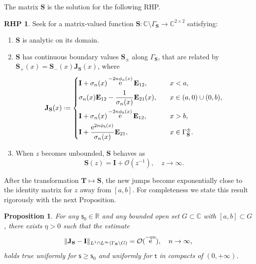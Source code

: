 \documentclass[reqno,a4paper,11pt]{amsart}
\DeclareMathOperator{\ee}{\rm e}
\newcommand{\C}{\mathbb{C}}
\newcommand{\R}{\mathbb{R}}
\newcommand{\Boh}{\mathcal{O}}
\renewcommand{\bm}{\mathbf}
\newcommand{\msf}{\mathsf}
\newcommand{\sad}{\msf s}
\newtheorem{prop}[theorem]{Proposition}
\theoremstyle{definition}
\newtheorem{rhp}[theorem]{RHP}
\theoremstyle{remark}
\numberwithin{equation}{section}
\newcommand*{\defeq}{\mathrel{\vcenter{\baselineskip0.5ex \lineskiplimit0pt
                     \hbox{\scriptsize.}\hbox{\scriptsize.}}}%
                     =}
\begin{document}
The  matrix $\bm S$ is the solution for the following RHP.
    \begin{rhp}
        Seek for a matrix-valued function $\bm S : \C \setminus \Gamma_{\bm S} \to \C^{2 \times 2}$ satisfying:
        \begin{enumerate}[\rm (i)]
            \item $\bm S$ is analytic on its domain.
            \item $\bm S$ has continuous boundary values $\bm S_{\pm}$ along $\Gamma_\bm S$, that are related by $\bm S_+(x) = \bm S_-(x) \bm J_{\bm S}(x)$, where
            \begin{equation}\label{deff:JS}
                \bm J_{\bm S}(x) \defeq
                    \begin{dcases}
                        \bm I + \sigma_n(x) \ee^{-2n \phi_a(x)} \bm E_{12}, \quad &x < a, \\
                        \sigma_n(x) \bm E_{12} - \frac{1}{\sigma_n(x)} \bm E_{21}(x), \quad &x \in (a,0) \cup (0,b), \\
                        \bm I + \sigma_n(x) \ee^{-2 n \phi_b(x)} \bm E_{12}, \quad &x > b, \\
                        \bm I + \frac{\ee^{2n \phi_b (x)}}{\sigma_n(x)} \bm E_{21}, \quad &x \in \Gamma_{\bm S}^\pm.
                    \end{dcases}
            \end{equation}
            \item When $z$ becomes unbounded, $\bm S$ behaves as 
            \[
                \bm S(z) = \bm I + \Boh(z^{-1}),\quad z\to \infty.
            \]
        \end{enumerate}
    \end{rhp}

After the transformation $\bm T\mapsto \bm S$, the new jumps become exponentially close to the identity matrix for $z$ away from $[a,b]$. For completeness we state this result rigorously with the next Proposition.

\begin{prop}\label{prop:estimateJS}
For any $\sad_0\in \R$ and any bounded open set $G\subset\C$ with $[a,b]\subset G$, there exists $\eta>0$ such that the estimate
%
$$
\|\bm J_{\bm S}-\bm I\|_{L^1\cap L^\infty(\Gamma_{\bm S}\setminus G)}=\Boh(\ee^{-\eta n}),\quad n\to \infty,
$$
%
holds true uniformly for $\sad \geq \sad_0$ and uniformly for $\msf t$ in compacts of $(0,+\infty)$.
\end{prop}
\end{document}
